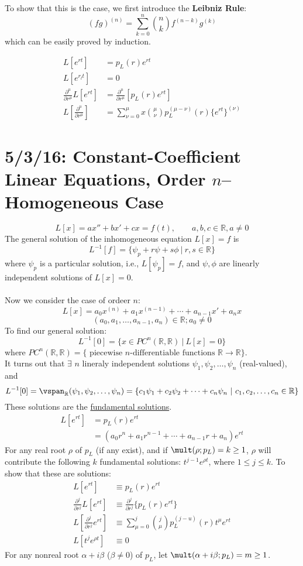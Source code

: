 \documentclass[12pt]{article}
\begin{document}
To show that this is the case, we first introduce the \textbf{Leibniz Rule}:
\[ (fg)^{(n)} = \sum_{k=0}^n \binom{n}{k}f^{(n-k)}g^{(k)} \]
which can be easily proved by induction.

\[
\begin{aligned}
  L[e^{rt}] &= p_L(r)e^{rt}  \\
  L[e^{r_lt}] &= 0 \\
  \frac{\partial^{\mu}}{\partial r^{\mu}} L[e^{rt}] &= \frac{\partial^{\mu}}{\partial r^{\mu}} [p_L(r)e^{rt}] \\
  L\left[\frac{\partial^{\mu}}{\partial r^{\mu}}\right] &= \sum_{\nu = 0}^{\mu}x \binom{\mu}{\nu}p_L^{(\mu - \nu)}(r)\{e^{rt}\}^{(\nu)} 
\end{aligned}
\]

\section{5/3/16: Constant-Coefficient Linear Equations, Order $n$--Homogeneous Case}
\[ L[x] = ax'' + bx' + cx = f(t), \qquad a,b,c \in \mathbb{R}, a\neq 0 \]
The general solution of the inhomogeneous equation $L[x] = f$ is \[ L^{-1}[f] = \{\psi_p + r\psi + s\phi \ | \ r,s \in \mathbb{R} \} \] where $\psi_p$ is a particular solution, i.e., $L[\psi_p] = f$, and $\psi, \phi$ are linearly independent solutions of $L[x] = 0$. \\\\
Now we consider the case of ordeer $n$:
\[ L[x] = a_0x^{(n)} + a_1x^{(n-1)} + \cdots + a_{n-1}x' + a_nx \]
\[ (a_0,a_1,\dots,a_{n-1},a_n) \in \mathbb{R}; a_0 \neq 0 \]
To find our general solution:
\[ L^{-1}[0] = \{ x \in PC^n(\mathbb{R},\mathbb{R}) \ | \ L[x] = 0 \} \]
where $PC^n(\mathbb{R},\mathbb{R}) = \{ \text{ piecewise $n$-differentiable functions } \mathbb{R} \to \mathbb{R} \}$. \\
It turns out that $\exists$ $n$ lineraly independent solutions $\psi_1, \psi_2, \dots, \psi_n$ (real-valued), and \[ L^{-1}[0] = \vspan_{\mathbb{R}}(\psi_1,\psi_2,\dots,\psi_n) = \{ c_1\psi_1 + c_2\psi_2 + \cdots + c_n\psi_n \ | \ c_1,c_2,\dots,c_n \in \mathbb{R} \} \]
These solutions are the \underline{fundamental solutions}.
\[
\begin{aligned}
  L[e^{rt}] &= p_L(r)e^{rt} \\
  &= (a_0r^n + a_1r^{n-1} + \cdots + a_{n-1}r + a_n)e^{rt} 
\end{aligned}
\]
For any real root $\rho$ of $p_L$ (if any exist), and if $\mult(\rho; p_L) = k \ge 1$, $\rho$ will contribute the following $k$ fundamental solutions: $t^{j-1}e^{\rho t}$, where $1 \le j \le k$.
To show that these are solutions:
\[
\begin{aligned}
  L[e^{rt}] &\equiv p_L(r)e^{rt} \\
  \frac{\partial^j}{\partial r^j} L[e^{rt}] &\equiv \frac{\partial^j}{\partial r^j}\{p_L(r)e^{rt}\} \\
  L\left[\frac{\partial^j}{\partial r^j}e^{rt}\right] &\equiv \sum_{\mu = 0}^j \binom{j}{\mu} p_L^{(j-u)}(r)t^{\mu}e^{rt} \\
  L[t^je^{\rho t}] &\equiv 0
\end{aligned}
\]
For any nonreal root $\alpha + i\beta$ ($\beta \neq 0$) of $p_L$, let $\mult(\alpha + i\beta; p_L) = m \ge 1$.
\end{document}
